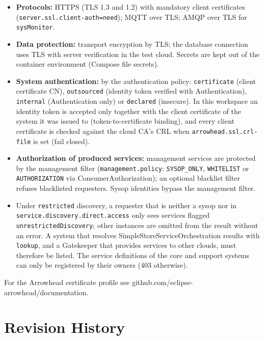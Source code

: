 \documentclass[a4paper]{arrowhead}
\begin{document}
\begin{itemize}
  \item \textbf{Protocols:} HTTPS (TLS 1.3 and 1.2) with mandatory client certificates (\texttt{server.ssl.client-auth=need}); MQTT over TLS; AMQP over TLS for \texttt{sysMonitor}.
  \item \textbf{Data protection:} transport encryption by TLS; the database connection uses TLS with server verification in the test cloud. Secrets are kept out of the container environment (Compose file secrets).
  \item \textbf{System authentication:} by the authentication policy: \texttt{certificate} (client certificate CN), \texttt{outsourced} (identity token verified with Authentication), \texttt{internal} (Authentication only) or \texttt{declared} (insecure). In this workspace an identity token is accepted only together with the client certificate of the system it was issued to (token-to-certificate binding), and every client certificate is checked against the cloud CA's CRL when \texttt{arrowhead.ssl.crl-file} is set (fail closed).
  \item \textbf{Authorization of produced services:} management services are protected by the management filter (\texttt{management.policy}: \texttt{SYSOP\_ONLY}, \texttt{WHITELIST} or \texttt{AUTHORIZATION} via ConsumerAuthorization); an optional blacklist filter refuses blacklisted requesters. Sysop identities bypass the management filter.
  \item Under \texttt{restricted} discovery, a requester that is neither a sysop nor in \texttt{service.\allowbreak{}discovery.\allowbreak{}direct.\allowbreak{}access} only sees services flagged \texttt{unrestricted\allowbreak{}Discovery}; other instances are omitted from the result without an error. A system that resolves Simple\allowbreak{}Store\allowbreak{}Service\allowbreak{}Orchestration results with \texttt{lookup}, and a Gatekeeper that provides services to other clouds, must therefore be listed. The service definitions of the core and support systems can only be registered by their owners (403 otherwise).
\end{itemize}

For the Arrowhead certificate profile see github.com/eclipse-arrowhead/documentation.





\newpage

\section{Revision History}
\end{document}
